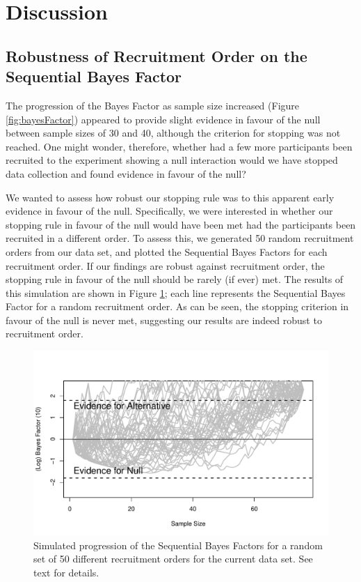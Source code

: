 \documentclass[a4paper, jou, natbib]{apa6}
\begin{document}
\section{Discussion}

\subsection{Robustness of Recruitment Order on the Sequential Bayes Factor}
The progression of the Bayes Factor as sample size increased (Figure \ref{fig:bayesFactor}) appeared to provide slight evidence in favour of the null between sample sizes of 30 and 40, although the criterion for stopping was not reached. One might wonder, therefore, whether had a few more participants been recruited to the experiment showing a null interaction would we have stopped data collection and found evidence in favour of the null?

We wanted to assess how robust our stopping rule was to this apparent early evidence in favour of the null. Specifically, we were interested in whether our stopping rule in favour of the null would have been met had the participants been recruited in a different order. To assess this, we generated 50 random recruitment orders from our data set, and plotted the Sequential Bayes Factors for each recruitment order. If our findings are robust against recruitment order, the stopping rule in favour of the null should be rarely (if ever) met.  The results of this simulation are shown in Figure \ref{fig:recruitmentOrder}; each line represents the Sequential Bayes Factor for a random recruitment order. As can be seen, the stopping criterion in favour of the null is never met, suggesting our results are indeed robust to recruitment order.


\begin{figure}
\begin{center}
\includegraphics[width = 0.5 \textwidth]{Images/recruitmentOrder.pdf}
\caption{Simulated progression of the Sequential Bayes Factors for a random set of 50 different recruitment orders for the current data set. See text for details.}
\label{fig:recruitmentOrder}
\end{center}
\end{figure}











\end{document}

